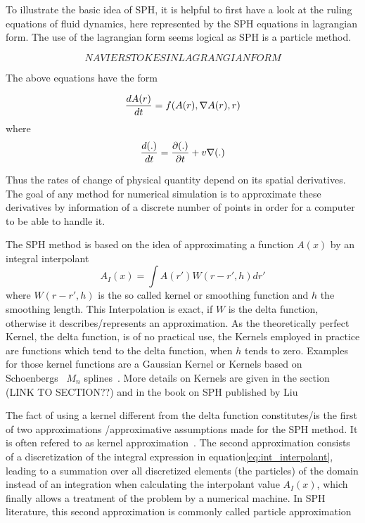 \documentclass{report}
\begin{document}
To illustrate the basic idea of SPH, it is helpful to first have a look at the
ruling equations of fluid dynamics, here represented by the SPH equations in
lagrangian form. The use of the lagrangian form seems logical as SPH is a
particle method.

\begin {equation}
NAVIER STOKES IN LAGRANGIAN FORM
\end {equation}

The above equations have the form~\cite{Monaghan2005}

\begin {equation}
\label{eq:EFD_form}
{dA(r)\over dt}=f(A(r),\nabla A(r),r)
\end {equation}
where
\begin {equation}
{d(.)\over dt}={\partial(.)\over \partial t}+v\nabla(.)
\end{equation}

Thus the rates of change of  physical quantity depend on its spatial
derivatives. The goal of any method for numerical simulation is to approximate
these derivatives by information of a discrete number of points in order for a
computer to be able to handle it. 


The SPH method is based on the idea of approximating a function $A(x)$ by an
integral interpolant
\begin{equation}
\label{eq:int_interpolant}
A_I(x)=\int A(r')W(r-r',h)dr'
\end{equation}
where $W(r-r',h)$ is the so called kernel or smoothing function and $h$ the
smoothing length. This Interpolation is exact, if $W$ is the delta function,
otherwise it describes/represents an approximation. As the theoretically
perfect Kernel, the delta function, is of no practical use, the Kernels
employed in practice are functions which tend to the delta function, when $h$
tends to zero. Examples for those kernel functions are a Gaussian Kernel or
Kernels based on Schoenbergs~\cite{Schoenberg1946} $M_n$ splines~\cite{Monaghan2005}. More details on Kernels are given in the section
(LINK TO SECTION??) and in the book on SPH published by Liu~\cite{Liu2003}

The fact of using a kernel different from the delta function constitutes/is the
first of two approximations /approximative assumptions made for the SPH
method. It is often refered to as kernel approximation~\cite{Liu2003}.
The second approximation consists of a discretization of the integral
expression in equation\ref{eq:int_interpolant}, leading to a summation over
all discretized elements (the particles) of the domain instead
of an integration when calculating the interpolant value $A_I(x)$, which
finally allows a treatment of the problem by a numerical machine. In SPH
literature, this second approximation is commonly called particle
approximation~\cite{Liu2003}
\end{document}
